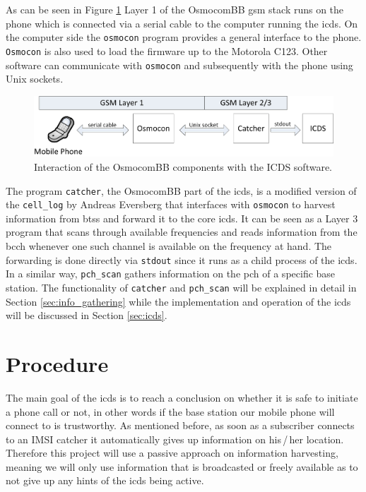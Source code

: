 As can be seen in Figure \ref{fig:osmo_setup} Layer 1 of the OsmocomBB \gls{gsm} stack runs on the phone which is connected via a serial cable to the computer running the \gls{icds}.
On the computer side the \texttt{osmocon} program provides a general interface to the phone.
\texttt{Osmocon} is also used to load the firmware up to the Motorola C123.
Other software can communicate with \texttt{osmocon} and subsequently with the phone using Unix sockets.
\begin{figure}
\centering
\includegraphics{../Images/OsmoStructure}
\caption{Interaction of the OsmocomBB components with the ICDS software.}
\label{fig:osmo_setup}
\end{figure}

The program \texttt{catcher}, the OsmocomBB part of the \gls{icds}, is a modified version of the \texttt{cell\_log} by Andreas Eversberg that interfaces with \texttt{osmocon} to harvest information from \glspl{bts} and forward it to the core \gls{icds}.
It can be seen as a Layer 3 program that scans through available frequencies and reads information from the \gls{bcch} whenever one such channel is available on the frequency at hand.
The forwarding is done directly via \texttt{stdout} since it runs as a child process of the \gls{icds}.
In a similar way, \texttt{pch\_scan} gathers information on the \gls{pch} of a specific base station.
The functionality of \texttt{catcher} and \texttt{pch\_scan} will be explained in detail in Section \ref{sec:info_gathering} while the implementation and operation of the \gls{icds} will be discussed in Section \ref{sec:icds}.

\section{Procedure}
The main goal of the \gls{icds} is to reach a conclusion on whether it is safe to initiate a phone call or not, in other words if the base station our mobile phone will connect to is trustworthy.
As mentioned before, as soon as a subscriber connects to an IMSI catcher it automatically gives up information on his\,/\,her location.
Therefore this project will use a passive approach on information harvesting, meaning we will only use information that is broadcasted or freely available as to not give up any hints of the \gls{icds} being active.

